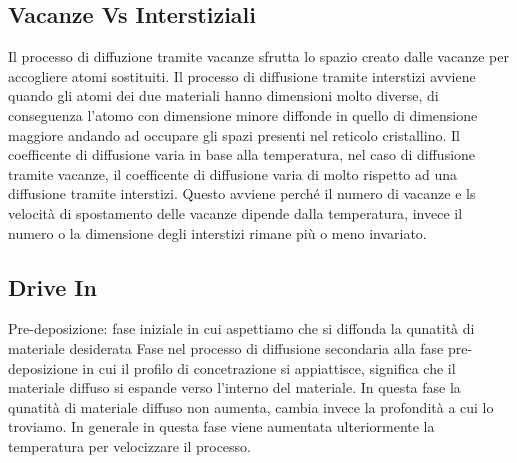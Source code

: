 \documentclass{article}%
\begin{document}
\subsection{ Vacanze Vs Interstiziali }%
\label{subsec:VacanzeVsInterstiziali}%
Il processo di diffuzione tramite vacanze sfrutta lo spazio creato dalle vacanze per accogliere atomi sostituiti.\newline%
%
Il processo di diffusione tramite interstizi avviene quando gli atomi dei due materiali hanno dimensioni molto diverse,\newline%
%
di conseguenza l'atomo con dimensione minore diffonde in quello di dimensione maggiore andando ad occupare gli spazi\newline%
%
presenti nel reticolo cristallino.\newline%
%
\newline%
%
Il coefficente di diffusione varia in base alla temperatura, nel caso di diffusione tramite vacanze, il coefficente di diffusione varia\newline%
%
di molto rispetto ad una diffusione tramite interstizi. Questo avviene perché il numero di vacanze e ls velocità di spostamento \newline%
%
delle vacanze dipende dalla temperatura, invece il numero o la dimensione degli interstizi rimane più o meno invariato.\newline%
%
\newline%

%
\subsection{ Drive In }%
\label{subsec:DriveIn}%
Pre{-}deposizione: fase iniziale in cui aspettiamo che si diffonda la qunatità di materiale desiderata\newline%
%
Fase nel processo di diffusione secondaria alla fase pre{-}deposizione in cui il profilo di concetrazione si appiattisce,\newline%
%
significa che il materiale diffuso si espande verso l'interno del materiale.\newline%
%
In questa fase la qunatità di materiale diffuso non aumenta, cambia invece la profondità a cui lo troviamo.\newline%
%
In generale in questa fase viene aumentata ulteriormente la temperatura per velocizzare il processo.\newline%
%
\newline%

%
\end{document}
